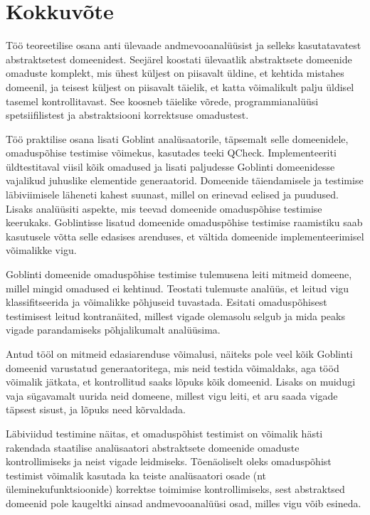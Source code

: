\documentclass[../thesis.tex]{subfiles}
\begin{document}
\section{Kokkuvõte}
Töö teoreetilise osana anti ülevaade andmevooanalüüsist ja selleks kasutatavatest abstraktsetest domeenidest. Seejärel koostati ülevaatlik abstraktsete domeenide omaduste komplekt, mis ühest küljest on piisavalt üldine, et kehtida mistahes domeenil, ja teisest küljest on piisavalt täielik, et katta võimalikult palju üldisel tasemel kontrollitavast. See koosneb täielike võrede, programmianalüüsi spetsiifilistest ja abstraktsiooni korrektsuse omadustest.

Töö praktilise osana lisati Goblint analüsaatorile, täpsemalt selle domeenidele, omaduspõhise testimise võimekus, kasutades teeki QCheck. Implementeeriti üldtestitaval viisil kõik omadused ja lisati paljudesse Goblinti domeenidesse vajalikud juhuslike elementide generaatorid. Domeenide täiendamisele ja testimise läbiviimisele läheneti kahest suunast, millel on erinevad eelised ja puudused. Lisaks analüüsiti aspekte, mis teevad domeenide omaduspõhise testimise keerukaks. Goblintisse lisatud domeenide omaduspõhise testimise raamistiku saab kasutusele võtta selle edasises arenduses, et vältida domeenide implementeerimisel võimalikke vigu.

Goblinti domeenide omaduspõhise testimise tulemusena leiti mitmeid domeene, millel mingid omadused ei kehtinud. Teostati tulemuste analüüs, et leitud vigu klassifitseerida ja võimalikke põhjuseid tuvastada. Esitati omaduspõhisest testimisest leitud kontranäited, millest vigade olemasolu selgub ja mida peaks vigade parandamiseks põhjalikumalt analüüsima.

Antud tööl on mitmeid edasiarenduse võimalusi, näiteks pole veel kõik Goblinti domeenid varustatud generaatoritega, mis neid testida võimaldaks, aga tööd võimalik jätkata, et kontrollitud saaks lõpuks kõik domeenid. Lisaks on muidugi vaja sügavamalt uurida neid domeene, millest vigu leiti, et aru saada vigade täpsest sisust, ja lõpuks need kõrvaldada.

Läbiviidud testimine näitas, et omaduspõhist testimist on võimalik hästi rakendada staatilise analüsaatori abstraktsete domeenide omaduste kontrollimiseks ja neist vigade leidmiseks. Tõenäoliselt oleks omaduspõhist testimist võimalik kasutada ka teiste analüsaatori osade (nt üleminekufunktsioonide) korrektse toimimise kontrollimiseks, sest abstraktsed domeenid pole kaugeltki ainsad andmevooanalüüsi osad, milles vigu võib esineda.
\end{document}
